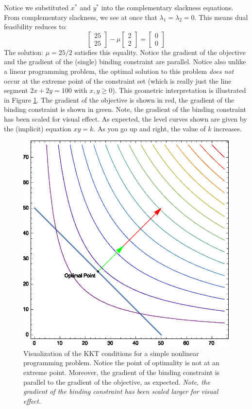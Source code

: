 Notice we substituted $x^*$ and $y^*$ into the complementary slackness equations. From complementary slackness, we see at once that $\lambda_1 = \lambda_2 = 0$. This means dual feasibility reduces to:
\begin{displaymath}
\begin{bmatrix}25\\25\end{bmatrix} - \mu\begin{bmatrix}2\\2\end{bmatrix} = \begin{bmatrix}0\\0\end{bmatrix}
\end{displaymath}
The solution: $\mu = 25/2$ satisfies this equality. Notice the gradient of the objective and the gradient of the (single) binding constraint are parallel. Notice also unlike a linear programming problem, the optimal solution to this problem \textit{does not} occur at the extreme point of the constraint set (which is really just the line segment $2x + 2y = 100$ with $x,y\geq 0$). This geometric interpretation is illustrated in Figure \ref{fig:KKTNLP}. The gradient of the objective is shown in red, the gradient of the binding constraint is shown in green. Note, the gradient of the binding constraint has been scaled for visual effect. As expected, the level curves shown are given by the (implicit) equation $xy = k$. As you go up and right, the value of $k$ increases.
\begin{figure}[htbp]
\centering
\includegraphics[scale=0.75]{imported_figures/KKTNLP.eps}
\caption{Visualization of the KKT conditions for a simple nonlinear programming problem. Notice the point of optimality is not at an extreme point. Moreover, the gradient of the binding constraint is parallel to the gradient of the objective, as expected. \textit{Note, the gradient of the binding constraint has been scaled larger for visual effect.}}
\label{fig:KKTNLP}
\end{figure}

